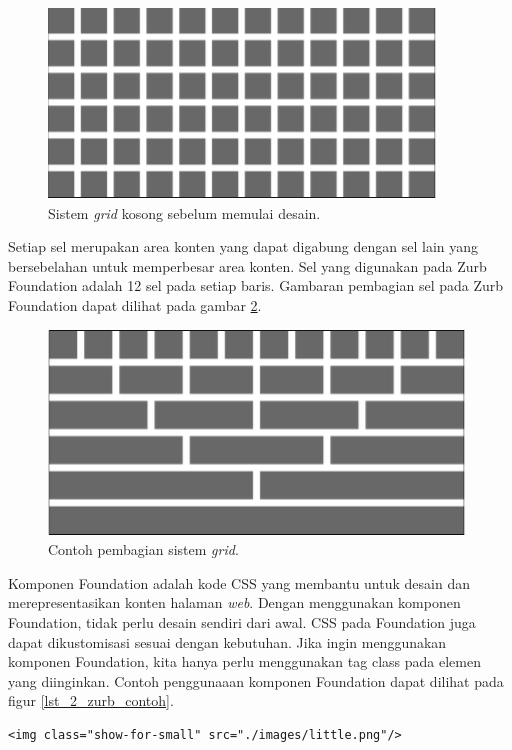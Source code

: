 \begin{figure}[H]
	\centering
	\includegraphics[scale=0.5]{Gambar/zurb-gridblank}
	\caption{Sistem \textit{grid} kosong sebelum memulai desain.} 
	\label{fig:2_zurb_grid_blank}
\end{figure}

Setiap sel merupakan area konten yang dapat digabung dengan sel lain yang bersebelahan untuk memperbesar area konten. Sel yang digunakan pada Zurb Foundation adalah 12 sel pada setiap baris. Gambaran pembagian sel pada Zurb Foundation dapat dilihat pada gambar \ref{fig:2_zurb_grid}.

\begin{figure}[H]
	\centering
	\includegraphics[scale=0.5]{Gambar/zurb-grid}
	\caption{Contoh pembagian sistem \textit{grid}.} 
	\label{fig:2_zurb_grid}
\end{figure}

Komponen Foundation adalah kode CSS  yang membantu untuk desain dan merepresentasikan konten halaman \textit{web}. Dengan menggunakan komponen Foundation, tidak perlu desain sendiri dari awal. CSS pada Foundation juga dapat dikustomisasi sesuai dengan kebutuhan. Jika ingin menggunakan komponen Foundation, kita hanya perlu menggunakan tag class pada elemen yang diinginkan. Contoh penggunaaan komponen Foundation dapat dilihat pada figur \ref{lst_2_zurb_contoh}.

\begin{lstlisting}[caption=Menggunakan kelas yang sudah disediakan dari Foundation,label = {lst_2_zurb_contoh}]
	<img class="show-for-small" src="./images/little.png"/>
\end{lstlisting}

